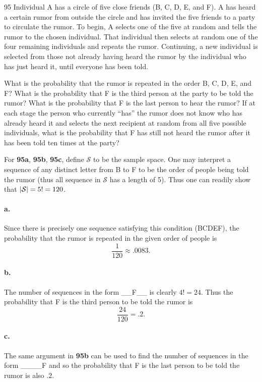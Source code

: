 \documentclass{exam}
\begin{document}
\begin{problem}{95}
	Individual A has a circle of five close friends (B, C, D, E, and F). A has heard a certain rumor from outside the circle and has invited the five friends to a party to circulate the rumor. To begin, A selects one of the five at random and tells the rumor to the chosen individual. That individual then selects at random one of the four remaining individuals and repeats the rumor. Continuing, a new individual is selected from those not already having heard the rumor by the individual who has just heard it, until everyone has been told.
	\begin{tasks}[label=\textbf{\alph*.}]
		\task What is the probability that the rumor is repeated in the order B, C, D, E, and F?
		\task What is the probability that F is the third person at the party to be told the rumor?
		\task What is the probability that F is the last person to hear the rumor?
		\task If at each stage the person who currently ``has'' the rumor does not know who has already heard it and selects the next recipient at random from all five possible individuals, what is the probability that F has still not heard the rumor after it has been told ten times at the party?
	\end{tasks}
\end{problem}

For \textbf{95a}, \textbf{95b}, \textbf{95c}, define $\mathcal S$ to be the sample space. One may interpret a sequence of any distinct letter from B to F to be the order of people being told the rumor (thus all sequence in $\mathcal S$ has a length of 5). Thus one can readily show that $\abs{\mathcal S} = 5! = 120$.

\paragraph{a.} Since there is precisely one sequence satisfying this condition (BCDEF), the probability that the rumor is repeated in the given order of people is
\[
	\frac{1}{120} \approx .0083.
\]

\paragraph{b.} The number of sequences in the form \_\_F\_\_ is clearly $4! = 24$. Thus the probability that F is the third person to be told the rumor is
\[
	\frac{24}{120} = .2.
\]

\paragraph{c.} The same argument in \textbf{95b} can be used to find the number of sequences in the form \_\_\_\_F and so the probability that F is the last person to be told the rumor is also $.2$.
\end{document}
